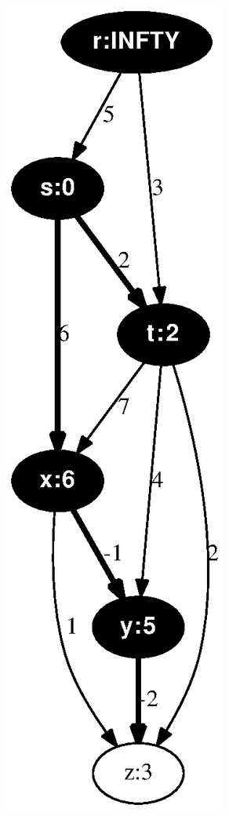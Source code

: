 \documentclass{article}
\begin{document}
\includegraphics[height=.3\textheight]{dag_shortest_path_05.eps}
\vspace{1em}
\end{document}
